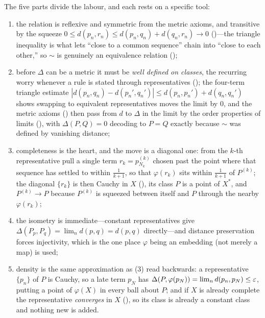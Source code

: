 \documentclass[main.tex]{subfiles}
\begin{document}
\begin{Reflection}
The five parts divide the labour, and each rests on a specific tool:
\begin{enumerate}[leftmargin=1.7em,itemsep=3pt,topsep=2pt,label=\textnormal{(\arabic*)}]
  \item the relation is reflexive and symmetric from the metric axioms, and transitive by the squeeze
        $0\le d(p_n,r_n)\le d(p_n,q_n)+d(q_n,r_n)\to 0$ ()---the triangle inequality is what
        lets ``close to a common sequence'' chain into ``close to each other,'' so $\sim$ is genuinely
        an equivalence relation ();
  \item before $\Delta$ can be a metric it must be \emph{well defined on classes}, the recurring worry
        whenever a rule is stated through representatives (); the four-term triangle
        estimate $|d(p_n,q_n)-d(p_n',q_n')|\le d(p_n,p_n')+d(q_n,q_n')$ shows swapping to equivalent
        representatives moves the limit by $0$, and the metric axioms () then pass from $d$
        to $\Delta$ in the limit by the order properties of limits (), with $\Delta(P,Q)=0$
        decoding to $P=Q$ exactly because $\sim$ was defined by vanishing distance;
  \item completeness is the heart, and the move is a diagonal one: from the $k$-th representative pull a
        single term $r_k=p^{(k)}_{N_k}$ chosen past the point where that sequence has settled to within
        $\tfrac1{k+1}$, so that $\varphi(r_k)$ sits within $\tfrac1{k+1}$ of $P^{(k)}$; the diagonal
        $\{r_k\}$ is then Cauchy in $X$ (), its class $P$ is a point of $X^*$, and
        $P^{(k)}\to P$ because $P^{(k)}$ is squeezed between itself and $P$ through the nearby
        $\varphi(r_k)$;
  \item the isometry is immediate---constant representatives give $\Delta(P_p,P_q)=\lim_n d(p,q)=d(p,q)$
        directly---and distance preservation forces injectivity, which is the one place $\varphi$ being
        an embedding (not merely a map) is used;
  \item density is the same approximation as (3) read backwards: a representative $\{p_n\}$ of $P$ is
        Cauchy, so a late term $p_N$ has $\Delta(P,\varphi(p_N))=\lim_n d(p_n,p_N)\le\varepsilon$, putting a
        point of $\varphi(X)$ in every ball about $P$; and if $X$ is already complete the representative
        \emph{converges} in $X$ (), so
        its class is already a constant class and nothing new is added.
\end{enumerate}


\end{Reflection}
\end{document}
